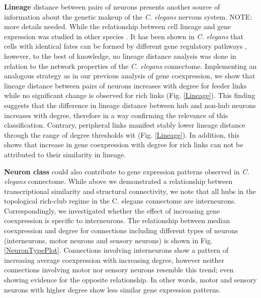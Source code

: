 \documentclass[10pt,letterpaper]{article}
\begin{document}
 
\textbf{Lineage} distance between pairs of neurons presents another source of information about the genetic makeup of the \textit{C. elegans} nervous system. 
NOTE: more details needed. While the relationship between cell lineage and gene expression was studied in other species \citep{Cui2007, Kluger2004}. 
It has been shown in \textit{C. elegans} that cells with identical fates can be formed by different gene regulatory pathways \citep{Liu2009}, however, to the best of knowledge, no lineage distance analysis was done in relation to the network properties of the \textit{C. elegans} connectome. 
Implementing an analogous strategy as in our previous analysis of gene coexpression, we show that lineage distance between pairs of neurons increases with degree for feeder links while no significant change is observed for rich links (Fig. \ref{Lineage}). 
This finding suggests that the difference in lineage distance between hub and non-hub neurons increases with degree, therefore in a way confirming the relevance of this classification. 
Contrary, peripheral links manifest stably lower lineage distance through the range of degree thresholds wit (Fig. \ref{Lineage}). 
In addition, this shows that increase in gene coexpression with degree for rich links can not be attributed to their similarity in lineage. 
   

 
 
\textbf{Neuron class} could also contribute to gene expression patterns observed in \textit{C. elegans} connectome.
While above we demonstrated a relationship between transcriptional similarity and structural connectivity, we note that all hubs in the topological rich-club regime in the C. elegans connectome are interneurons.
Correspondingly, we investigated whether the effect of increasing gene coexpression is specific to interneurons.
The relationship between median coexpression and degree for connections including different types of neurons (interneurons, motor neurons and sensory neurons) is shown in Fig. \ref{NeuronTypePlot}.
Connections involving interneurons show a pattern of increasing average coexpression with increasing degree, however neither connections involving motor nor sensory neurons resemble this trend; even showing evidence for the opposite relationship.
In other words, motor and sensory neurons with higher degree show less similar gene expression patterns.
\end{document}
